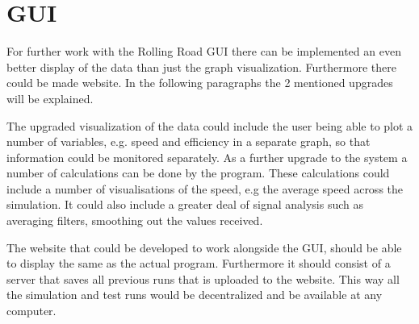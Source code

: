 \section{GUI}
For further work with the Rolling Road GUI there can be implemented an even better display of the data than just the graph visualization. Furthermore there could be made website. In the following paragraphs the 2 mentioned upgrades will be explained. 

The upgraded visualization of the data could include the user being able to plot a number of variables, e.g. speed and efficiency in a separate graph, so that information could be monitored separately. As a further upgrade to the system a number of calculations can be done by the program. These calculations could include a number of visualisations of the speed, e.g the average speed across the simulation. It could also include a greater deal of signal analysis such as averaging filters, smoothing out the values received. 

The website that could be developed to work alongside the GUI, should be able to display the same as the actual program. Furthermore it should consist of a server that saves all previous runs that is uploaded to the website. This way all the simulation and test runs would be decentralized and be available at any computer.  